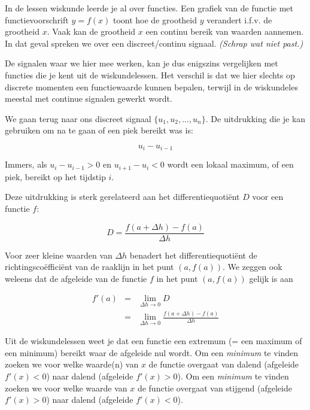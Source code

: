 \begin{oef}
	In de lessen wiskunde leerde je al over functies. Een grafiek van de functie met functievoorschrift $y=f(x)$ toont hoe de grootheid $y$ verandert i.f.v. de grootheid $x$. Vaak kan de grootheid $x$ een continu bereik van waarden aannemen. In dat geval spreken we over een discreet/continu signaal. \emph{(Schrap wat niet past.)}
\end{oef}

De signalen waar we hier mee werken, kan je dus enigszins vergelijken met functies die je kent uit de wiskundelessen. 
Het verschil is dat we hier slechts op discrete momenten een functiewaarde kunnen bepalen, terwijl in de wiskundeles meestal met continue signalen gewerkt wordt.

We gaan terug naar ons discreet signaal $\{ u_1, u_2, \ldots, u_n\}$. De uitdrukking die je kan gebruiken om na te gaan of een piek bereikt was is:

\begin{equation*}
u_i-u_{i-1}
\end{equation*}

Immers, als $u_{i}-u_{i-1}>0$ en $u_{i+1}-u_{i}<0$ wordt een lokaal maximum, of een piek, bereikt op het tijdstip $i$.

Deze uitdrukking is sterk gerelateerd aan het differentiequoti\"ent $D$ voor een functie $f$:

\begin{equation}
D = \frac{f(a+\Delta h) - f(a)}{\Delta h}
\end{equation}

Voor zeer kleine waarden van $\Delta h$ benadert het differentiequoti\"ent de richtingsco\"effici\"ent van de raaklijn in het punt $(a,f(a))$. We zeggen ook weleens dat de afgeleide van de functie $f$ in het punt $(a,f(a))$ gelijk is aan 

\begin{eqnarray*}
f'(a) &=& \lim\limits_{\Delta h \to 0} D \\
&=& \lim\limits_{\Delta h \to 0} \frac{f(a+\Delta h)-f(a)}{\Delta h}
\end{eqnarray*}

Uit de wiskundelessen weet je dat een functie een extremum (= een maximum of een minimum) bereikt waar de afgeleide nul wordt. Om een \emph{minimum} te vinden zoeken we voor welke waarde(n) van $x$ de functie overgaat van dalend (afgeleide $f'(x)< 0$) naar dalend (afgeleide $f'(x)> 0$). Om een \emph{minimum} te vinden zoeken we voor welke waarde van $x$ de functie overgaat van stijgend (afgeleide $f'(x)>0$) naar dalend (afgeleide $f'(x)<0$).

